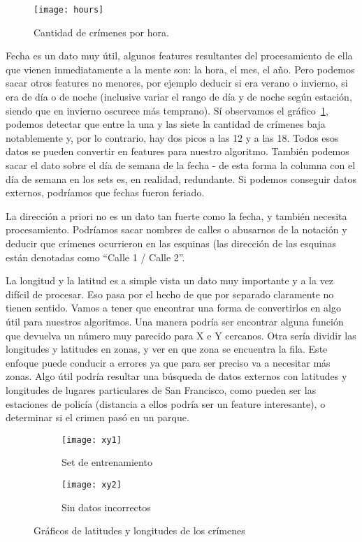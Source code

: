 \begin{figure}[H]
\texttt{[image: hours]}
\caption{Cantidad de crímenes por hora.}
\label{fig:hours}
\end{figure}

Fecha es un dato muy útil, algunos features resultantes del procesamiento de ella que vienen inmediatamente a la mente son: la hora, el mes, el año. Pero podemos sacar otros features no menores, por ejemplo deducir si era verano o invierno, si era de día o de noche (inclusive variar el rango de día y de noche según estación, siendo que en invierno oscurece más temprano). Sí observamos el gráfico~\ref{fig:hours}, podemos detectar que entre la una y las siete la cantidad de crímenes baja notablemente y, por lo contrario, hay dos picos a las 12 y a las 18. Todos esos datos se pueden convertir en features para nuestro algoritmo. También podemos sacar el dato sobre el día de semana de la fecha - de esta forma la columna con el día de semana en los sets es, en realidad, redundante. Si podemos conseguir datos externos, podríamos que fechas fueron feriado.

La dirección a priori no es un dato tan fuerte como la fecha, y también necesita procesamiento. Podríamos sacar nombres de calles o abusarnos de la notación y deducir que crímenes ocurrieron en las esquinas (las dirección de las esquinas están denotadas como ``Calle 1 / Calle 2''.

La longitud y la latitud es a simple vista un dato muy importante y a la vez difícil de procesar. Eso pasa por el hecho de que por separado claramente no tienen sentido. Vamos a tener que encontrar una forma de convertirlos en algo útil para nuestros algoritmos. Una manera podría ser encontrar alguna función que devuelva un número muy parecido para X e Y cercanos. Otra sería dividir las longitudes y latitudes en zonas, y ver en que zona se encuentra la fila. Este enfoque puede conducir a errores ya que para ser preciso va a necesitar más zonas. Algo útil podría resultar una búsqueda de datos externos con latitudes y longitudes de lugares particulares de San Francisco, como pueden ser las estaciones de policía (distancia a ellos podría ser un feature interesante), o determinar si el crimen pasó en un parque.

\begin{figure}[H]
\centering
\begin{subfigure}{.5\textwidth}
  \centering
  \texttt{[image: xy1]}
  \caption{Set de entrenamiento}
  \label{fig:xy1}
\end{subfigure}%
\begin{subfigure}{.5\textwidth}
  \centering
  \texttt{[image: xy2]}
  \caption{Sin datos incorrectos}
  \label{fig:xy2}
\end{subfigure}
\caption{Gráficos de latitudes y longitudes de los crímenes}
\label{fig:xy}
\end{figure}

